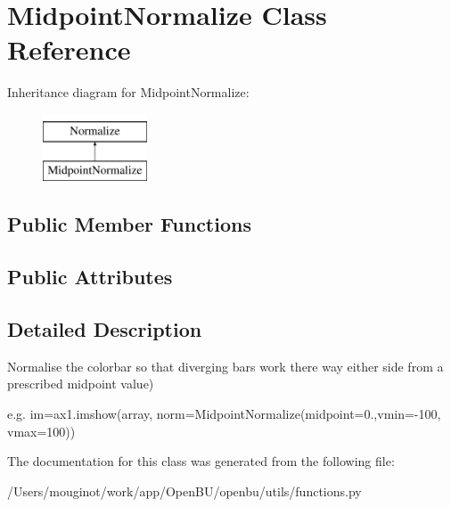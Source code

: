 \hypertarget{classopenbu_1_1utils_1_1functions_1_1_midpoint_normalize}{}\section{Midpoint\+Normalize Class Reference}
\label{classopenbu_1_1utils_1_1functions_1_1_midpoint_normalize}
Inheritance diagram for Midpoint\+Normalize\+:\begin{figure}[H]
\begin{center}
\leavevmode
\includegraphics[height=2.000000cm]{classopenbu_1_1utils_1_1functions_1_1_midpoint_normalize}
\end{center}
\end{figure}
\subsection*{Public Member Functions}
\subsection*{Public Attributes}


\subsection{Detailed Description}
\begin{DoxyVerb}Normalise the colorbar so that diverging bars work there way either side from a prescribed midpoint value)

e.g. im=ax1.imshow(array, norm=MidpointNormalize(midpoint=0.,vmin=-100, vmax=100))
\end{DoxyVerb}
 

The documentation for this class was generated from the following file\+:\begin{DoxyCompactItemize}
\item 
/\+Users/mouginot/work/app/\+Open\+B\+U/openbu/utils/functions.\+py\end{DoxyCompactItemize}
